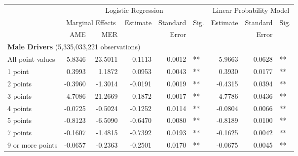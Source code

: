 
\begin{table}%
\centering 
\begin{tabular}{l r r r r l r r l} 

\hline 
 
 & \multicolumn{5}{c}{Logistic Regression}  & \multicolumn{3}{c}{Linear Probability Model} \\ 

 \cmidrule(lr){2-6}\cmidrule(lr){7-9} 
 & \multicolumn{2}{c}{Marginal Effects} & Estimate & Standard & Sig. & Estimate & Standard & Sig. \\ 

 \cmidrule(lr){2-3} 
 &   AME & MER &          &  Error   &      &          &  Error   &     \\ 

\hline 
 
\multicolumn{8}{l}{\textbf{Male Drivers} (5,335,033,221 observations)} \\ 

All point values                &  -5.8346        &  -23.5011       &  -0.1113        &  0.0012       &   **       &  -5.9663        &  0.0628       &   **       \\ 
1 point                         &  0.3993        &  1.1872       &  0.0953        &  0.0043       &   **       &  0.3930        &  0.0177       &   **       \\ 
2 points                        &  -0.3960        &  -1.3014       &  -0.0191        &  0.0019       &   **       &  -0.4315        &  0.0394       &   **       \\ 
3 points                        &  -4.7086        &  -21.2669       &  -0.1872        &  0.0017       &   **       &  -4.7786        &  0.0436       &   **       \\ 
4 points                        &  -0.0725        &  -0.5024       &  -0.1252        &  0.0114       &   **       &  -0.0804        &  0.0066       &   **       \\ 
5 points                        &  -0.8123        &  -6.5090       &  -0.6470        &  0.0080       &   **       &  -0.8189        &  0.0100       &   **       \\ 
7 points                        &  -0.1607        &  -1.4815       &  -0.7392        &  0.0193       &   **       &  -0.1625        &  0.0042       &   **       \\ 
9 or more points                &  -0.0657        &  -0.2363       &  -0.2501        &  0.0170       &   **       &  -0.0675        &  0.0045       &   **       \\ 


\end{tabular}
\end{table}
